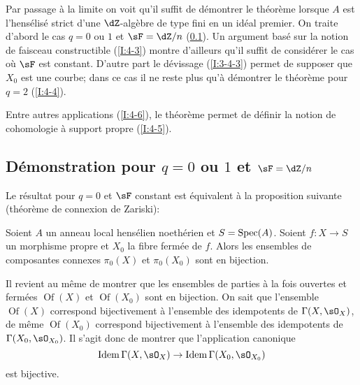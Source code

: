 Par passage à la limite on voit qu'il suffit de démontrer le théorème 
lorsque $A$ est l'hensélisé strict d'une $\dZ$-algèbre  de type fini en 
un idéal premier. On traite d'abord le cas $q=0$ ou $1$ et $\sF=\dZ/n$ 
(\ref{I:4-2}). Un argument basé sur la notion de faisceau constructible 
(\ref{I:4-3}) montre d'ailleurs qu'il suffit de considérer le cas où $\sF$ est 
constant. D'autre part le dévissage (\ref{I:3-4-3}) permet de supposer que 
$X_0$ est une courbe; dans ce cas il ne reste plus qu'à démontrer le 
théorème pour $q=2$ (\ref{I:4-4}). 

Entre autres applications (\ref{I:4-6}), le théorème permet de définir la notion 
de cohomologie à support propre (\ref{I:4-5}). 










\subsection{Démonstration pour \texorpdfstring{$q=0$}{q=1} ou \texorpdfstring{$1$}{1} et \texorpdfstring{$\sF=\dZ/n$}{\sF=Z/n}}\label{I:4-2} 

Le résultat pour $q=0$ et $\sF$ constant est équivalent à la proposition 
suivante (théorème de connexion de Zariski):





\begin{proposition}\label{I:4-2-1}
Soient $A$ un anneau local hensélien noethérien et $S=\operatorname{Spec}(A)$. 
Soient $f:X\to S$ un morphisme propre et $X_0$ la fibre fermée de $f$. Alors 
les ensembles de composantes connexes $\pi_0(X)$ et $\pi_0(X_0)$ sont en 
bijection.
\end{proposition}

Il revient au même de montrer que les ensembles de parties à la fois 
ouvertes et fermées $\operatorname{Of}(X)$ et $\operatorname{Of}(X_0)$ sont 
en bijection. On sait que l'ensemble $\operatorname{Of}(X)$ correspond 
bijectivement à l'ensemble des idempotents de $\Gamma(X,\sO_X)$, de même 
$\operatorname{Of}(X_0)$ correspond bijectivement à l'ensemble des 
idempotents de $\Gamma(X_0,\sO_{X_0})$. Il s'agit donc de montrer que 
l'application canonique 
\[
  \operatorname{Idem} \Gamma(X,\sO_X) \to \operatorname{Idem}\Gamma(X_0,\sO_{X_0})
\]
est bijective. 

